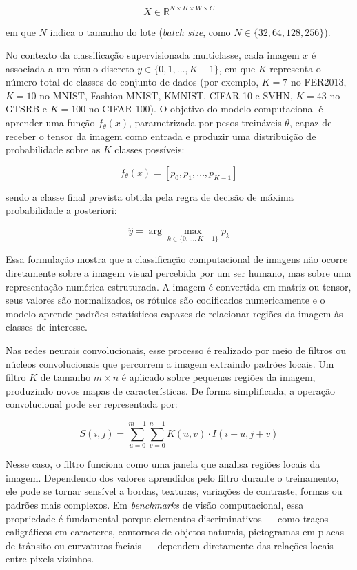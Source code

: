 \documentclass[
    12pt,
    openright,
    oneside,
    a4paper,
    english,
    brazil
]{abntex2}
\begin{document}
\[
X \in \mathbb{R}^{N \times H \times W \times C}
\]

em que \(N\) indica o tamanho do lote (\textit{batch size}, como \(N \in \{32, 64, 128, 256\}\)).

No contexto da classificação supervisionada multiclasse, cada imagem \(x\) é associada a um rótulo discreto \(y \in \{0, 1, \dots, K-1\}\), em que \(K\) representa o número total de classes do conjunto de dados (por exemplo, \(K=7\) no FER2013, \(K=10\) no MNIST, Fashion-MNIST, KMNIST, CIFAR-10 e SVHN, \(K=43\) no GTSRB e \(K=100\) no CIFAR-100). O objetivo do modelo computacional é aprender uma função \(f_{\theta}(x)\), parametrizada por pesos treináveis \(\theta\), capaz de receber o tensor da imagem como entrada e produzir uma distribuição de probabilidade sobre as \(K\) classes possíveis:

\[
f_{\theta}(x) = [p_0, p_1, \dots, p_{K-1}]
\]

sendo a classe final prevista obtida pela regra de decisão de máxima probabilidade a posteriori:

\[
\hat{y} = \arg\max_{k \in \{0, \dots, K-1\}} p_k
\]

Essa formulação mostra que a classificação computacional de imagens não ocorre diretamente sobre a imagem visual percebida por um ser humano, mas sobre uma representação numérica estruturada. A imagem é convertida em matriz ou tensor, seus valores são normalizados, os rótulos são codificados numericamente e o modelo aprende padrões estatísticos capazes de relacionar regiões da imagem às classes de interesse.

Nas redes neurais convolucionais, esse processo é realizado por meio de filtros ou núcleos convolucionais que percorrem a imagem extraindo padrões locais. Um filtro \(K\) de tamanho \(m \times n\) é aplicado sobre pequenas regiões da imagem, produzindo novos mapas de características. De forma simplificada, a operação convolucional pode ser representada por:

\[
S(i,j) = \sum_{u=0}^{m-1}\sum_{v=0}^{n-1} K(u,v) \cdot I(i+u,j+v)
\]

Nesse caso, o filtro funciona como uma janela que analisa regiões locais da imagem. Dependendo dos valores aprendidos pelo filtro durante o treinamento, ele pode se tornar sensível a bordas, texturas, variações de contraste, formas ou padrões mais complexos. Em \textit{benchmarks} de visão computacional, essa propriedade é fundamental porque elementos discriminativos --- como traços caligráficos em caracteres, contornos de objetos naturais, pictogramas em placas de trânsito ou curvaturas faciais --- dependem diretamente das relações locais entre pixels vizinhos.
\end{document}
